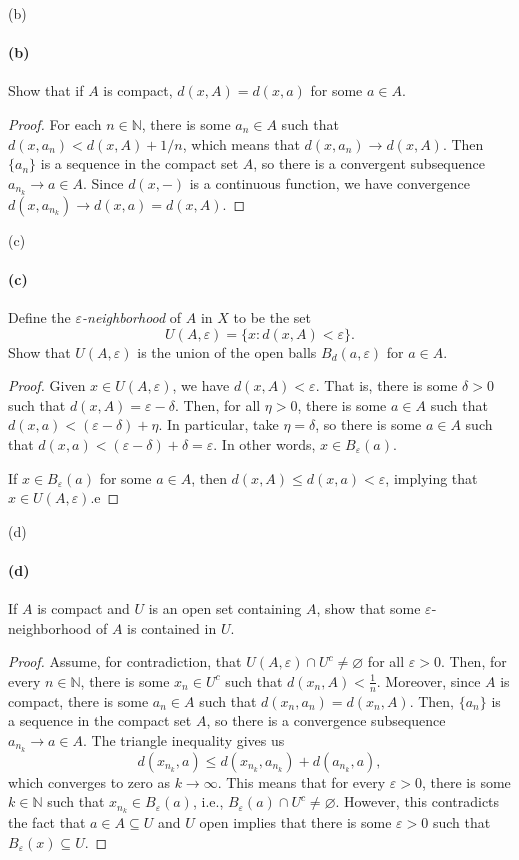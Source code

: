 \documentclass[12pt]{article}
\newlength{\myparskip}
\newenvironment{fullbox}{\begin{lrbox}{\savefullbox}\begin{minipage}{\dimexpr\textwidth-2\fboxsep\relax}\setlength{\parskip}{\myparskip}}{\end{minipage}\end{lrbox}\framebox[\textwidth]{\usebox{\savefullbox}}}
\newenvironment{pbox}[1][]{\begin{fullbox}\ifx#1\empty\else\paragraph{#1}\fi}{\end{fullbox}}
\newcommand{\N}{\mathbb{N}}
\newcommand{\eps}{\varepsilon}
\renewcommand{\emptyset}{\varnothing}
\newcommand{\<}{\langle}
\renewcommand{\>}{\rangle}
\begin{document}
\begin{pbox}[(b)]
    Show that if $A$ is compact, $d(x,A)=d(x,a)$ for some $a \in A$.
\end{pbox}

\begin{proof}
    For each $n \in \N$, there is some $a_n \in A$ such that $d(x, a_n) < d(x, A) + 1/n$, which means that $d(x, a_n) \to d(x, A)$. Then $\{a_n\}$ is a sequence in the compact set $A$, so there is a convergent subsequence $a_{n_k} \to a \in A$. Since $d(x, -)$ is a continuous function, we have convergence $d(x, a_{n_k}) \to d(x, a) = d(x, A)$.
    
\end{proof}

\begin{pbox}[(c)]
    Define the \emph{$\eps$-neighborhood} of $A$ in $X$ to be the set
        \[U(A,\eps)=\{x : d(x,A)<\eps\}.\]
        Show that $U(A,\eps)$ is the union of the open balls $B_d(a,\eps)$ for
        $a \in A$.
\end{pbox}

\begin{proof}
    Given $x \in U(A, \eps)$, we have $d(x, A) < \eps$. That is, there is some $\delta > 0$ such that $d(x, A) = \eps - \delta$. Then, for all $\eta > 0$, there is some $a \in A$ such that $d(x, a) < (\eps - \delta) + \eta$. In particular, take $\eta = \delta$, so there is some $a \in A$ such that $d(x, a) < (\eps - \delta) + \delta = \eps$. In other words, $x \in B_\eps(a)$.

    If $x \in B_\eps(a)$ for some $a \in A$, then $d(x, A) \leq d(x, a) < \eps$, implying that $x \in U(A, \eps)$.e

\end{proof}

\newpage
\begin{pbox}[(d)]
    If $A$ is compact and $U$ is an open set containing $A$, show that some
        $\eps$-neighborhood of $A$ is contained in $U$.
\end{pbox}

\begin{proof}
    Assume, for contradiction, that $U(A, \eps) \cap U^c \ne \emptyset$ for all $\eps > 0$. Then, for every $n \in \N$, there is some $x_n \in U^c$ such that $d(x_n, A) < \frac{1}{n}$. Moreover, since $A$ is compact, there is some $a_n \in A$ such that $d(x_n, a_n) = d(x_n, A)$. Then, $\{a_n\}$ is a sequence in the compact set $A$, so there is a convergence subsequence $a_{n_k} \to a \in A$. The triangle inequality gives us
    \[
        d(x_{n_k}, a)
            \leq d(x_{n_k}, a_{n_k}) + d(a_{n_k}, a),
    \] 
    which converges to zero as $k \to \infty$. This means that for every $\eps > 0$, there is some $k \in \N$ such that $x_{n_k} \in B_{\eps}(a)$, i.e., $B_\eps(a) \cap U^c \ne \emptyset$. However, this contradicts the fact that $a \in A \subseteq U$ and $U$ open implies that there is some $\eps > 0$ such that $B_\eps(x) \subseteq U$. 

\end{proof}
\end{document}
